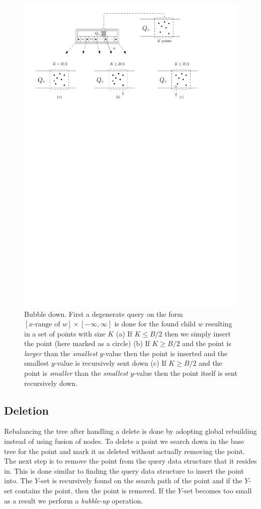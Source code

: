\documentclass[twoside,11pt,openright]{report}
\begin{document}
\begin{figure}[t]
	\centering
	\includegraphics[width=1\textwidth]{../figures/arge_bubble_down}
	\caption{Bubble down. First a degenerate query on the form $\left[ x\text{-range of }w \right] \times \left[ - \infty, \infty \right]$ is done for the found child $w$ resulting in a set of points with size $K$ (a) If $K \leq B/2$ then we simply insert the point (here marked as a circle) (b) If $K \geq B/2$ and the point is \textit{larger} than the \textit{smallest} $y$-value then the point is inserted and the smallest $y$-value is recursively sent down (c) If $K \geq B/2$ and the point is \textit{smaller} than the \textit{smallest} $y$-value then the point itself is sent recursively down.}
	\label{fig:arge_bubble_down}
\end{figure}

\subsection{Deletion}
Rebalancing the tree after handling a delete is done by adopting global rebuilding instead of using fusion of nodes. To delete a point we search down in the base tree for the point and mark it as deleted without actually removing the point. The next step is to remove the point from the query data structure that it resides in. This is done similar to finding the query data structure to insert the point into. The $Y$-set is recursively found on the search path of the point and if the $Y$-set contains the point, then the point is removed. If the $Y$-set becomes too small as a result we perform a \textit{bubble-up} operation.
\end{document}

